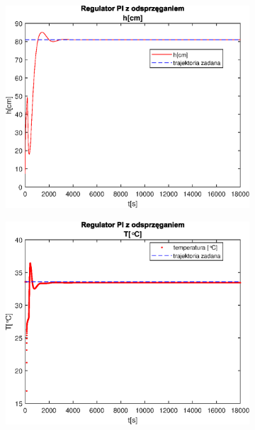 \begin{figure}[h!]
   \centering
   \begin{subfigure}[b]{0.4\textwidth}
      \includegraphics[width=1\linewidth]{img/PI/decoupler/disturbance/PIDecouplerH2.eps}
      \caption{}
      \label{fig:fig:PIDecoupler21}
   \end{subfigure}
       
   \begin{subfigure}[b]{0.4\textwidth}
      \includegraphics[width=1\linewidth]{img/PI/decoupler/disturbance/PIDecouplerT2.eps}
      \caption{}
      \label{fig:fig:PIDecoupler22}
   \end{subfigure}
       

\end{figure}
